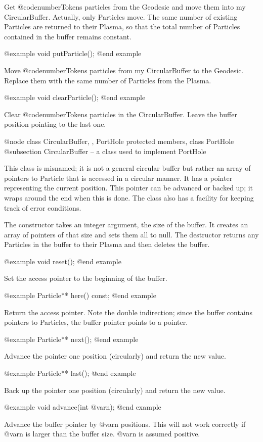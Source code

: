 Get @code{numberTokens} particles from the Geodesic and move them into
my CircularBuffer.  Actually, only Particles move.  The same number of
existing Particles are returned to their Plasma, so that the total
number of Particles contained in the buffer remains constant.

@example
void putParticle();
@end example

Move @code{numberTokens} particles from my CircularBuffer to the
Geodesic.  Replace them with the same number of Particles from the Plasma.

@example
void clearParticle();
@end example

Clear @code{numberTokens} particles in the CircularBuffer.  Leave the
buffer position pointing to the last one.

@node class CircularBuffer,  , PortHole protected members, class PortHole
@subsection CircularBuffer -- a class used to implement PortHole

This class is misnamed; it is not a general circular buffer but
rather an array of pointers to Particle that is accessed in a
circular manner.  It has a pointer representing the current position.
This pointer can be advanced or backed up; it wraps around the end
when this is done.  The class also has a facility for keeping
track of error conditions.

The constructor takes an integer argument, the size of the buffer.
It creates an array of pointers of that size and sets them all to
null.  The destructor returns any Particles in the buffer to their
Plasma and then deletes the buffer.

@example
void reset();
@end example

Set the access pointer to the beginning of the buffer.

@example
Particle** here() const;
@end example

Return the access pointer.  Note the double indirection; since the
buffer contains pointers to Particles, the buffer pointer points
to a pointer.

@example
Particle** next();
@end example

Advance the pointer one position (circularly) and return the new value.

@example
Particle** last();
@end example

Back up the pointer one position (circularly) and return the new value.

@example
void advance(int @var{n});
@end example

Advance the buffer pointer by @var{n} positions.  This will not work correctly
if @var{n} is larger than the buffer size.  @var{n} is assumed positive.

